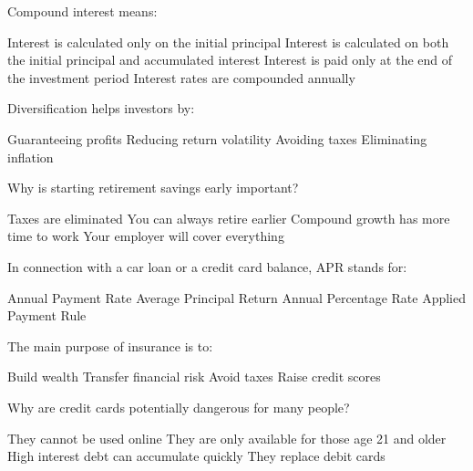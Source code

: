 \documentclass[12pt]{exam}
\begin{document}
\begin{questions}
  \begin{mcquestion}[2]
    Compound interest means:
    \begin{choices}
      \choice Interest is calculated only on the initial principal
      \CorrectChoice Interest is calculated on both the initial principal and accumulated interest
      \choice Interest is paid only at the end of the investment period
      \choice Interest rates are compounded annually
    \end{choices}
  \end{mcquestion}

  \begin{mcquestion}[2]
    Diversification helps investors by:
    \begin{choices}
      \choice Guaranteeing profits
      \CorrectChoice Reducing return volatility
      \choice Avoiding taxes
      \choice Eliminating inflation
    \end{choices}
  \end{mcquestion}

  \begin{mcquestion}[2]
    Why is starting retirement savings early important?
    \begin{choices}
      \choice Taxes are eliminated
      \choice You can always retire earlier
      \CorrectChoice Compound growth has more time to work
      \choice Your employer will cover everything
    \end{choices}
  \end{mcquestion}

  \begin{mcquestion}[2]
    In connection with a car loan or a credit card balance, APR stands for:
    \begin{choices}
      \choice Annual Payment Rate
      \choice Average Principal Return
      \CorrectChoice Annual Percentage Rate
      \choice Applied Payment Rule
    \end{choices}
  \end{mcquestion}

  \begin{mcquestion}[2]
    The main purpose of insurance is to:
    \begin{choices}
      \choice Build wealth
      \CorrectChoice Transfer financial risk
      \choice Avoid taxes
      \choice Raise credit scores
    \end{choices}
  \end{mcquestion}

  \begin{mcquestion}[2]
    Why are credit cards potentially dangerous for many people?
    \begin{choices}
      \choice They cannot be used online
      \choice They are only available for those age 21 and older
      \CorrectChoice High interest debt can accumulate quickly
      \choice They replace debit cards
    \end{choices}
  \end{mcquestion}


\end{questions}
\end{document}
